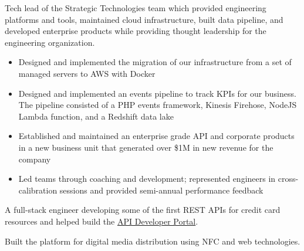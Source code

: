 \documentclass[10pt,a4paper,ragged2e,withhyper]{altacv}
\begin{document}
\begin{paracol}{2}

\divider{}

Tech lead of the Strategic Technologies team which provided engineering platforms and tools, maintained cloud infrastructure, built data pipeline, and developed enterprise products while providing thought leadership for the engineering organization.
\begin{itemize}
\item Designed and implemented the migration of our infrastructure from a set of managed servers to AWS with Docker
\item Designed and implemented an events pipeline to track KPIs for our business. The pipeline consisted of a PHP events framework, Kinesis Firehose, NodeJS Lambda function, and a Redshift data lake
\item Established and maintained an enterprise grade API and corporate products in a new business unit that generated over \$1M in new revenue for the company
\item Led teams through coaching and development; represented engineers in cross-calibration sessions and provided semi-annual performance feedback
\end{itemize}


\divider{}

A full-stack engineer developing some of the first REST APIs for credit card resources and helped build the \href{https://developer.capitalone.com}{API Developer Portal}.


\divider{}


Built the platform for digital media distribution using NFC and web technologies.


\end{paracol}
\end{document}
